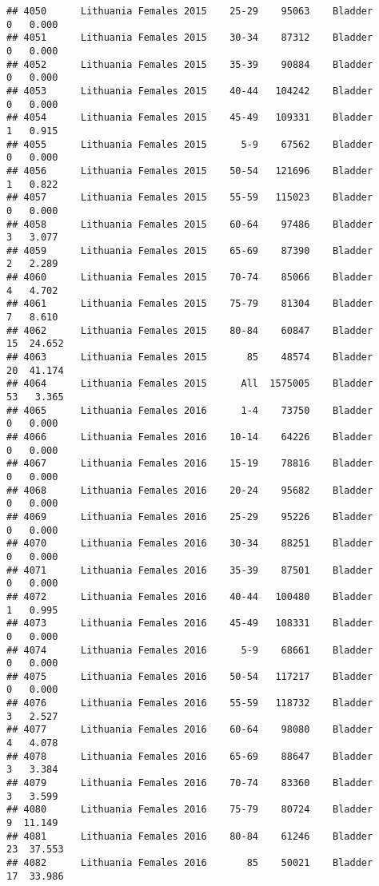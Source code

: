 \documentclass[
]{article}
\begin{document}
\begin{verbatim}
## 4050      Lithuania Females 2015    25-29    95063    Bladder      0   0.000
## 4051      Lithuania Females 2015    30-34    87312    Bladder      0   0.000
## 4052      Lithuania Females 2015    35-39    90884    Bladder      0   0.000
## 4053      Lithuania Females 2015    40-44   104242    Bladder      0   0.000
## 4054      Lithuania Females 2015    45-49   109331    Bladder      1   0.915
## 4055      Lithuania Females 2015      5-9    67562    Bladder      0   0.000
## 4056      Lithuania Females 2015    50-54   121696    Bladder      1   0.822
## 4057      Lithuania Females 2015    55-59   115023    Bladder      0   0.000
## 4058      Lithuania Females 2015    60-64    97486    Bladder      3   3.077
## 4059      Lithuania Females 2015    65-69    87390    Bladder      2   2.289
## 4060      Lithuania Females 2015    70-74    85066    Bladder      4   4.702
## 4061      Lithuania Females 2015    75-79    81304    Bladder      7   8.610
## 4062      Lithuania Females 2015    80-84    60847    Bladder     15  24.652
## 4063      Lithuania Females 2015       85    48574    Bladder     20  41.174
## 4064      Lithuania Females 2015      All  1575005    Bladder     53   3.365
## 4065      Lithuania Females 2016      1-4    73750    Bladder      0   0.000
## 4066      Lithuania Females 2016    10-14    64226    Bladder      0   0.000
## 4067      Lithuania Females 2016    15-19    78816    Bladder      0   0.000
## 4068      Lithuania Females 2016    20-24    95682    Bladder      0   0.000
## 4069      Lithuania Females 2016    25-29    95226    Bladder      0   0.000
## 4070      Lithuania Females 2016    30-34    88251    Bladder      0   0.000
## 4071      Lithuania Females 2016    35-39    87501    Bladder      0   0.000
## 4072      Lithuania Females 2016    40-44   100480    Bladder      1   0.995
## 4073      Lithuania Females 2016    45-49   108331    Bladder      0   0.000
## 4074      Lithuania Females 2016      5-9    68661    Bladder      0   0.000
## 4075      Lithuania Females 2016    50-54   117217    Bladder      0   0.000
## 4076      Lithuania Females 2016    55-59   118732    Bladder      3   2.527
## 4077      Lithuania Females 2016    60-64    98080    Bladder      4   4.078
## 4078      Lithuania Females 2016    65-69    88647    Bladder      3   3.384
## 4079      Lithuania Females 2016    70-74    83360    Bladder      3   3.599
## 4080      Lithuania Females 2016    75-79    80724    Bladder      9  11.149
## 4081      Lithuania Females 2016    80-84    61246    Bladder     23  37.553
## 4082      Lithuania Females 2016       85    50021    Bladder     17  33.986

\end{verbatim}
\end{document}
